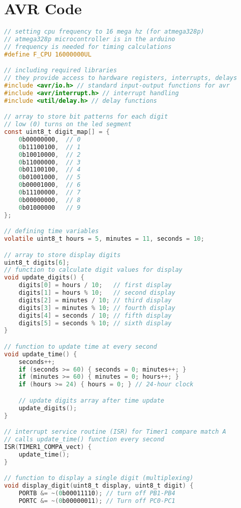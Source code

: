 \documentclass[12pt,a4paper]{article}
\begin{document}
\section{AVR Code}
\begin{lstlisting}[language=C, basicstyle=\ttfamily, keywordstyle=\color{blue}, commentstyle=\color{green}]
// setting cpu frequency to 16 mega hz (for atmega328p)
// atmega328p microcontroller is in the arduino
// frequency is needed for timing calculations
#define F_CPU 16000000UL

// including required libraries
// they provide access to hardware registers, interrupts, delays
#include <avr/io.h> // standard input-output functions for avr
#include <avr/interrupt.h> // interrupt handling
#include <util/delay.h> // delay functions

// array to store bit patterns for each digit
// low (0) turns on the led segment
const uint8_t digit_map[] = {
    0b00000000,  // 0
    0b11100100,  // 1
    0b10010000,  // 2
    0b11000000,  // 3
    0b01100100,  // 4
    0b01001000,  // 5
    0b00001000,  // 6
    0b11100000,  // 7
    0b00000000,  // 8
    0b01000000   // 9
};

// defining time variables
volatile uint8_t hours = 5, minutes = 11, seconds = 10;

// array to store display digits
uint8_t digits[6];
// function to calculate digit values for display
void update_digits() {
    digits[0] = hours / 10;   // first display
    digits[1] = hours % 10;   // second display
    digits[2] = minutes / 10; // third display
    digits[3] = minutes % 10; // fourth display
    digits[4] = seconds / 10; // fifth display
    digits[5] = seconds % 10; // sixth display
}

// function to update time at every second
void update_time() {
    seconds++;
    if (seconds >= 60) { seconds = 0; minutes++; }
    if (minutes >= 60) { minutes = 0; hours++; }
    if (hours >= 24) { hours = 0; } // 24-hour clock

    // update digits array after time update
    update_digits();
}

// interrupt service routine (ISR) for Timer1 compare match A
// calls update_time() function every second
ISR(TIMER1_COMPA_vect) {
    update_time();
}

// function to display a single digit (multiplexing)
void display_digit(uint8_t display, uint8_t digit) {
    PORTB &= ~(0b00011110); // turn off PB1-PB4
    PORTC &= ~(0b00000011); // Turn off PC0-PC1


\end{lstlisting}
\end{document}
